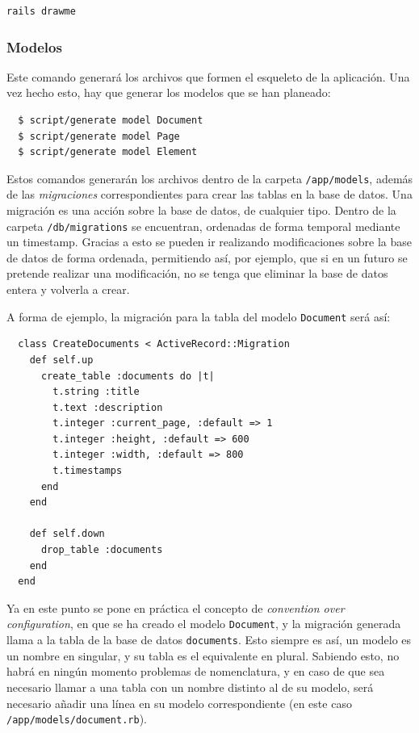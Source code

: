 \begin{verbatim}
rails drawme
\end{verbatim}

\subsubsection{Modelos} %
\label{ssub:modelos}

Este comando generará los archivos que formen el esqueleto de la aplicación. Una vez hecho esto, hay que generar los modelos que se han planeado:

\begin{verbatim}
  $ script/generate model Document
  $ script/generate model Page
  $ script/generate model Element
\end{verbatim}

Estos comandos generarán los archivos dentro de la carpeta \texttt{/app/models}, además de las \emph{migraciones} correspondientes para crear las tablas en la base de datos. Una migración es una acción sobre la base de datos, de cualquier tipo. Dentro de la carpeta \texttt{/db/migrations} se encuentran, ordenadas de forma temporal mediante un timestamp. Gracias a esto se pueden ir realizando modificaciones sobre la base de datos de forma ordenada, permitiendo así, por ejemplo, que si en un futuro se pretende realizar una modificación, no se tenga que eliminar la base de datos entera y volverla a crear.

A forma de ejemplo, la migración para la tabla del modelo \texttt{Document} será así:

\begin{verbatim}
  class CreateDocuments < ActiveRecord::Migration
    def self.up
      create_table :documents do |t|
        t.string :title
        t.text :description
        t.integer :current_page, :default => 1
        t.integer :height, :default => 600
        t.integer :width, :default => 800
        t.timestamps
      end
    end

    def self.down
      drop_table :documents
    end
  end
\end{verbatim}

Ya en este punto se pone en práctica el concepto de \emph{convention over configuration}, en que se ha creado el modelo \texttt{Document}, y la migración generada llama a la tabla de la base de datos \texttt{documents}. Esto siempre es así, un modelo es un nombre en singular, y su tabla es el equivalente en plural. Sabiendo esto, no habrá en ningún momento problemas de nomenclatura, y en caso de que sea necesario llamar a una tabla con un nombre distinto al de su modelo, será necesario añadir una línea en su modelo correspondiente (en este caso \texttt{/app/models/document.rb}).

